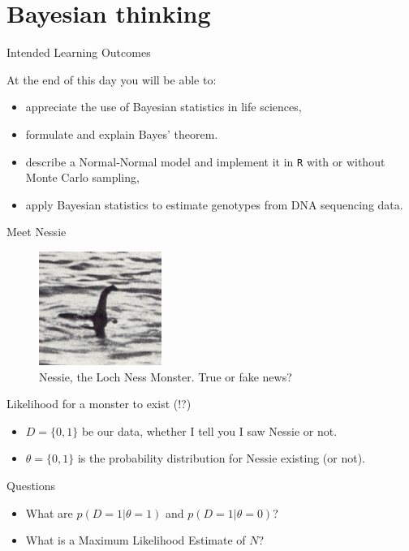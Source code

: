 
\section{Bayesian thinking}

\begin{frame}{Intended Learning Outcomes}

        At the end of this day you will be able to:
        \begin{itemize}
                \item appreciate the use of Bayesian statistics in life sciences,
                \item formulate and explain Bayes' theorem.
		\item describe a Normal-Normal model and implement it in \texttt{R} with
		or without Monte Carlo sampling,
                \item apply Bayesian statistics to estimate genotypes from DNA sequencing data.
        \end{itemize}

\end{frame}

\begin{frame}{Meet Nessie}

	\begin{figure}[!ht]
		\centering
		\includegraphics[width=4cm]{Images/LochNessMonster.jpg}
		\caption{Nessie, the Loch Ness Monster. True or fake news?}
		\label{Fig:LochNess}
	\end{figure}

\end{frame}

\begin{frame}{Likelihood for a monster to exist (!?)}

	\begin{itemize}
		\item $D = \{0,1\}$ be our data, whether I tell you I saw Nessie or not.
		\item $\theta = \{0,1\}$ is the probability distribution for Nessie existing (or not).
	\end{itemize}

	\begin{block}{Questions}
		\begin{itemize}
			\item What are $p(D=1|\theta=1)$ and $p(D=1|\theta=0)$?
			\item What is a Maximum Likelihood Estimate of $N$?
		\end{itemize}
	\end{block}

\end{frame}

